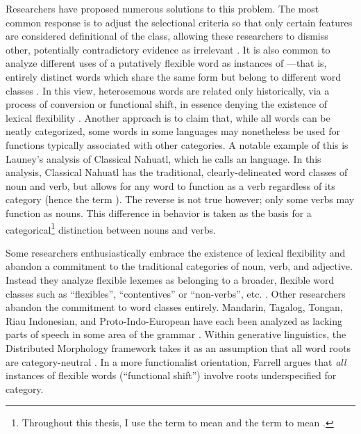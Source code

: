 Researchers have proposed numerous solutions to this problem. The most common response is to adjust the selectional criteria so that only certain features are considered definitional of the class, allowing these researchers to dismiss other, potentially contradictory evidence as irrelevant . It is also common to analyze different uses of a putatively flexible word as instances of —that is, entirely distinct words which share the same form but belong to different word classes . In this view, heterosemous words are related only historically, via a process of conversion or functional shift, in essence denying the existence of lexical flexibility . Another approach is to claim that, while all words can be neatly categorized, some words in some languages may nonetheless be used for functions typically associated with other categories. A notable example of this is Launey's  analysis of Classical Nahuatl, which he calls an  language. In this analysis, Classical Nahuatl has the traditional, clearly-delineated word classes of noun and verb, but allows for any word to function as a verb regardless of its category (hence the term ). The reverse is not true however; only some verbs may function as nouns.  This difference in behavior is taken as the basis for a categorical\footnote{Throughout this thesis, I use the term  to mean  and the term  to mean .} distinction between nouns and verbs.

Some researchers enthusiastically embrace the existence of lexical flexibility and abandon a commitment to the traditional categories of noun, verb, and adjective. Instead they analyze flexible lexemes as belonging to a broader, flexible word classes such as \enquote{flexibles}, \enquote{contentives} or \enquote{non-verbs}, etc. . Other researchers abandon the commitment to word classes entirely. Mandarin, Tagalog, Tongan, Riau Indonesian, and Proto-Indo-European have each been analyzed as lacking parts of speech in some area of the grammar . Within generative linguistics, the Distributed Morphology framework takes it as an assumption that all word roots are category-neutral . In a more functionalist orientation, Farrell  argues that \emph{all} instances of flexible words (\enquote{functional shift}) involve roots underspecified for category.

